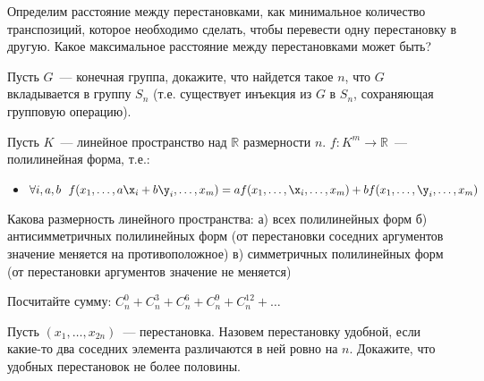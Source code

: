 \setcounter{curtask}{15}


\begin{task}
	Определим расстояние между перестановками, как минимальное количество
	транспозиций, которое необходимо сделать, чтобы перевести одну перестановку в
	другую. Какое максимальное расстояние между перестановками может быть?
\end{task}

\begin{task}
	Пусть $G$~--- конечная группа, докажите, что найдется такое $n$, что $G$
    вкладывается в группу $S_n$ (т.е. существует инъекция из $G$ в $S_n$, сохраняющая
    групповую операцию).
\end{task}

\begin{task}
    Пусть $K$~--- линейное пространство над $\mathbb{R}$ размерности $n$.
    $f: K^m \to \mathbb{R}$~--- полилинейная форма, т.е.:
    \begin{itemize}
	    \item $\forall i, a, b ~~ f(x_1, \dots, a \x_i + b \y_i, \dots, x_m) =
    		a f(x_1, \dots, \x_i, \dots, x_m) + b f(x_1, \dots, \y_i, \dots, x_m)$
    \end{itemize}
    Какова размерность линейного пространства:
    а) всех полилинейных форм
    б) антисимметричных полилинейных форм (от перестановки соседних аргументов
    значение меняется на противоположное)
    в) симметричных полилинейных форм (от перестановки аргументов значение не меняется)
\end{task}

\begin{task}
    Посчитайте сумму:
    $C_{n}^{0} + C_{n}^{3} + C_{n}^{6} + C_{n}^{9} + C_{n}^{12} + \dots$
\end{task}

\begin{task}
    Пусть $(x_1, \dots, x_{2n})$~--- перестановка. Назовем перестановку удобной, если
    какие-то два соседних элемента различаются в ней ровно на $n$. Докажите, что
    удобных перестановок не более половины.
\end{task}

